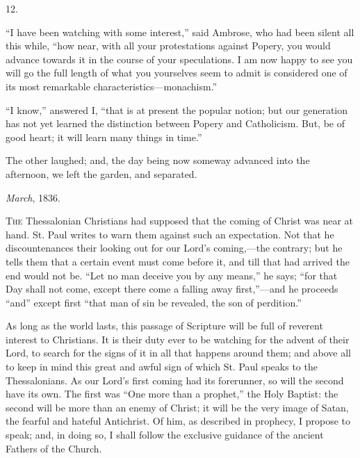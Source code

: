 12.

``I have been watching with some interest,'' said
Ambrose, who had been silent all this while, ``how near, with all your
protestations against Popery, you would advance towards it in the
course of your speculations. I am now happy to see you will go the
full length of what you yourselves seem to admit is considered one of
its most remarkable characteristics—monachism.''

``I know,'' answered I, ``that is at present the
popular notion; but our generation has not yet learned the distinction
between Popery and Catholicism. But, be of good heart; it will learn
many things in time.''

The other laughed; and, the day being now someway
advanced into the afternoon, we left the garden, and separated.

\emph{March}, 1836.



T\textsc{he} Thessalonian Christians had supposed that the coming of
Christ was near at hand. St. Paul writes to warn them against such an
expectation. Not that he discountenances their looking out for our
Lord's coming,—the contrary; but he tells them that a certain event
must come before it, and till that had arrived the end would not be.
``Let no man deceive you by any means,'' he says; ``for
that Day shall not come, except there come a falling away first,''—and
he proceeds ``and'' except first ``that man of sin be
revealed, the son of perdition.''

As long as the world lasts, this passage of Scripture will be full
of reverent interest to Christians. It is their duty ever to be
watching for the advent of their Lord, to search for the signs of it
in all that happens around them; and above all to keep in mind this
great and awful sign of which St. Paul speaks to the Thessalonians. As
our Lord's first coming had its forerunner, so will the second
have its own. The first was ``One more than a prophet,'' the
Holy Baptist: the second will be more than an enemy of Christ; it will
be the very image of Satan, the fearful and hateful Antichrist. Of
him, as described in prophecy, I propose to speak; and, in doing so, I
shall follow the exclusive guidance of the ancient Fathers of the
Church.

